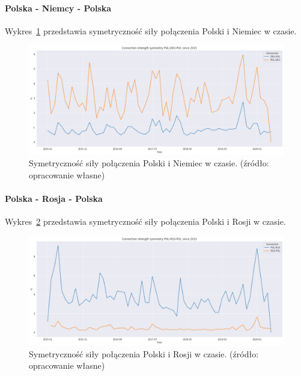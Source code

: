 \documentclass[11pt]{report}
\begin{document}
    \paragraph{Polska - Niemcy - Polska}

    Wykres~\ref{fig:POL-DEU-POL} przedstawia symetryczność siły połączenia Polski i Niemiec w czasie.


    \begin{figure}[ht!]
        \centering
        \includegraphics[width=1 \textwidth]{fig/ConnectionSymmetry/POL-DEU-POL.png}
        \caption{Symetryczność siły połączenia Polski i Niemiec w czasie. (źródło: opracowanie własne)}
        \label{fig:POL-DEU-POL}
    \end{figure}

    \paragraph{Polska - Rosja - Polska}

    Wykres~\ref{fig:POL-RUS-POL} przedstawia symetryczność siły połączenia Polski i Rosji w czasie.


    \begin{figure}[ht!]
        \centering
        \includegraphics[width=1 \textwidth]{fig/ConnectionSymmetry/POL-RUS-POL.png}
        \caption{Symetryczność siły połączenia Polski i Rosji w czasie. (źródło: opracowanie własne)}
        \label{fig:POL-RUS-POL}
    \end{figure}
\end{document}
